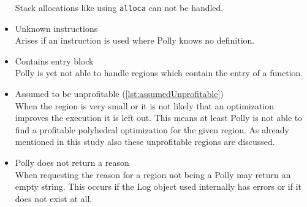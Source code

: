 \begin{itemize}
        Stack allocations like using \texttt{alloca} can not be handled.
    \item Unknown instructions\\
        Arises if an instruction is used where Polly knows no definition.
    \item Contains entry block\\
        Polly is yet not able to handle regions which contain the entry of a function.
    \item Assumed to be unprofitable (\autoref{lst:assumedUnprofitable})\\
        When the region is very small or it is not likely that an optimization improves the execution it is left out.
        This means at least Polly is not able to find a profitable polyhedral optimization for the given region.
        As already mentioned in this study also these unprofitable regions are discussed.
    \item Polly does not return a reason\\
        When requesting the reason for a region not being a \scop Polly may return an empty string.
        This occurs if the Log object used internally has errors or if it does not exist at all.
\end{itemize}


